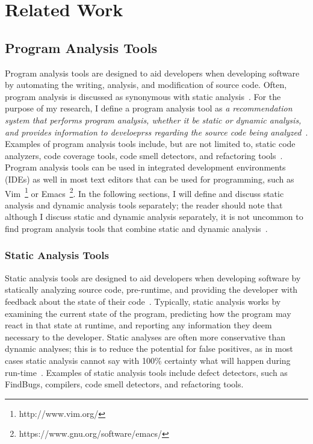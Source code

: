 \chapter{Related Work}
\label{chap:related}

\section{Program Analysis Tools}
Program analysis tools are designed to aid developers when developing software by automating the writing, analysis, and modification of source code.
Often, program analysis is discussed as synonymous with static analysis~\cite{nielson2015principles}. 
For the purpose of my research, I define a program analysis tool as \emph{a recommendation system that performs program analysis, whether it be static or dynamic analysis, and provides information to develoeprss regarding the source code being analyzed}~\cite{robillard2014recommendation}.
Examples of program analysis tools include, but are not limited to, static code analyzers, code coverage tools, code smell detectors, and refactoring tools~\cite{adolph2011using,Murphy-Hill:2010:Ambient,ge2012reconciling}.
Program analysis tools can be used in integrated development environments (IDEs) as well in most text editors that can be used for programming, such as Vim~\footnote{http://www.vim.org/} or Emacs~\footnote{https://www.gnu.org/software/emacs/}. 
In the following sections, I will define and discuss static analysis and dynamic analysis tools separately; the reader should note that although I discuss static and dynamic analysis separately, it is not uncommon to find program analysis tools that combine static and dynamic analysis~\cite{ernst2003static}.                                                

\subsection{Static Analysis Tools}

Static analysis tools are designed to aid developers when developing software by statically analyzing source code, pre-runtime, and providing the developer with feedback about the state of their code~\cite{ernst2003static}.
Typically, static analysis works by examining the current state of the program, predicting how the program may react in that state at runtime, and reporting any information they deem necessary to the developer. Static analyses are often more conservative than dynamic analyses; this is to reduce the potential for false positives, as in most cases static analysis cannot say with 100\% certainty what will happen during run-time~\cite{ernst2003static}. 
Examples of static analysis tools include defect detectors, such as FindBugs, compilers, code smell detectors, and refactoring tools.

